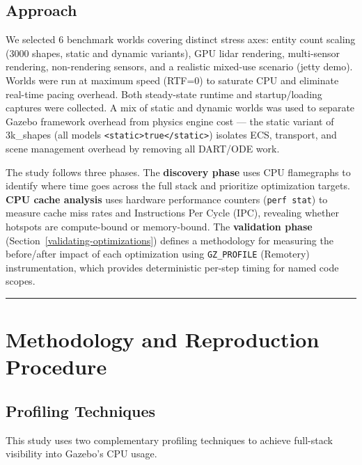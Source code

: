 \documentclass[11pt, a4paper]{article}
\begin{document}
\hypertarget{approach}{%
\subsection{Approach}\label{approach}}

We selected 6 benchmark worlds covering distinct stress axes: entity
count scaling (3000 shapes, static and dynamic variants), GPU lidar
rendering, multi-sensor rendering, non-rendering sensors, and a
realistic mixed-use scenario (jetty demo). Worlds were run at maximum
speed (RTF=0) to saturate CPU and eliminate real-time pacing overhead.
Both steady-state runtime and startup/loading captures were collected. A
mix of static and dynamic worlds was used to separate Gazebo framework
overhead from physics engine cost --- the static variant of 3k\_shapes
(all models
\texttt{\textless{}static\textgreater{}true\textless{}/static\textgreater{}})
isolates ECS, transport, and scene management overhead by removing all
DART/ODE work.

The study follows three phases. The \textbf{discovery phase} uses CPU flamegraphs to identify where time goes across the full stack and prioritize optimization targets. \textbf{CPU cache analysis} uses hardware performance counters (\texttt{perf stat}) to measure cache miss rates and Instructions Per Cycle (IPC), revealing whether hotspots are compute-bound or memory-bound. The \textbf{validation phase} (Section~\ref{validating-optimizations}) defines a methodology for measuring the before/after impact of each optimization using \texttt{GZ\_PROFILE} (Remotery) instrumentation, which provides deterministic per-step timing for named code scopes.

\begin{center}\rule{0.5\linewidth}{0.5pt}\end{center}

\hypertarget{methodology-and-reproduction-procedure}{%
\section{Methodology and Reproduction
Procedure}\label{methodology-and-reproduction-procedure}}

\hypertarget{profiling-techniques}{%
\subsection{Profiling Techniques}\label{profiling-techniques}}

This study uses two complementary profiling techniques to achieve
full-stack visibility into Gazebo's CPU usage.
\end{document}
